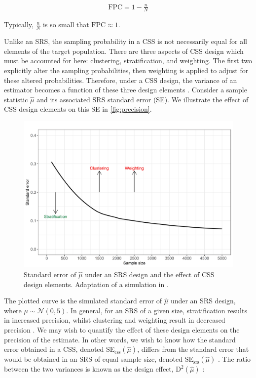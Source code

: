 \begin{align}
\label{eq:fpc}
\text{FPC} = 1 - \frac{n}{N}
\end{align}

Typically, $\frac{n}{N}$ is so small that $\text{FPC} \approx 1$. 

Unlike an SRS, the sampling probability in a CSS is not necessarily equal for all elements of the target population. There are three aspects of CSS design which must be  accounted for here: clustering, stratification, and weighting. The first two explicitly alter the sampling probabilities, then weighting is applied to adjust for these altered probabilities. Therefore, under a CSS design, the variance of an estimator becomes a function of these three design elements \citep{heeringa2017}. Consider a sample statistic $\widehat{\mu}$ and its associated SRS standard error (SE). We illustrate the effect of CSS design elements on this SE in \autoref{fig:precision}.

\begin{figure}[ht]
\includegraphics[scale = 0.09]{images/srs_se}
\caption{Standard error of $\widehat{\mu}$ under an SRS design and the effect of CSS design elements. Adaptation of a simulation in \citet{heeringa2017}.}
\label{fig:precision}
\end{figure}

The plotted curve is the simulated standard error of $\widehat{\mu}$ under an SRS design, where $\mu \sim \mathcal{N}(0, 5)$. In general, for an SRS of a given size, stratification results in increased precision, whilst clustering and weighting result in decreased precision \citep{heeringa2017}. We may wish to quantify the effect of these design elements on the precision of the estimate. In other words, we wish to know how the standard error obtained in a CSS, denoted $\text{SE}_{\text{css}}(\widehat{\mu})$, differs from the standard error that would be obtained in an SRS of equal sample size, denoted $\text{SE}_{\text{srs}}(\widehat{\mu})$ \citep{heeringa2017}. The ratio between the two variances is known as the design effect, $\text{D}^{2}(\widehat{\mu})$ \citep{kish1965}:


